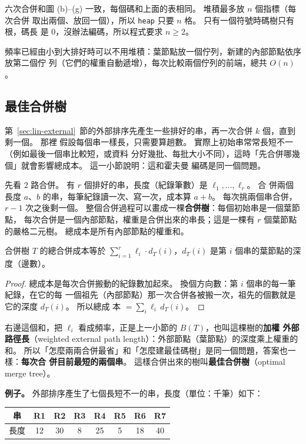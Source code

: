 六次合併和圖 (b)--(g) 一致，每個碼和上面的表相同。 堆積最多放 $n$ 個指標（每次合併
取出兩個、放回一個），所以 \texttt{heap} 只要 $n$ 格。 只有一個符號時碼樹只有根，碼長
是 $0$，沒辦法編碼，所以程式要求 $n \ge 2$。

頻率已經由小到大排好時可以不用堆積：葉節點放一個佇列，新建的內部節點依序放第二個佇
列（它們的權重自動遞增），每次比較兩個佇列的前端，總共 $O(n)$。

\subsection{最佳合併樹}
\label{sec:gr-merge}

第~\ref{sec:lin-external}~節的外部排序先產生一些排好的串，再一次合併 $k$ 個，直到剩一個。 那裡
假設每個串一樣長，只需要算趟數。 實際上初始串常常長短不一（例如最後一個串比較短，或資料
分好幾批、每批大小不同），這時「先合併哪幾個」就會影響總成本。 這一小節說明：這和霍夫曼
編碼是同一個問題。

先看 $2$ 路合併。 有 $r$ 個排好的串，長度（紀錄筆數）是 $\ell_1, \ldots, \ell_r$。 合
併兩個長度 $a$、$b$ 的串，每筆紀錄讀一次、寫一次，成本算 $a + b$。 每次挑兩個串合併，
$r - 1$ 次之後剩一個。 整個合併過程可以畫成一棵\textbf{合併樹}：每個初始串是一個葉節點，
每次合併是一個內部節點，權重是合併出來的串長；這是一棵有 $r$ 個葉節點的嚴格二元樹。
總成本是所有內部節點的權重和。

\begin{lemma}
\label{lem:gr-merge-cost}
合併樹 $T$ 的總合併成本等於 $\sum_{i=1}^{r} \ell_i \cdot d_T(i)$，$d_T(i)$ 是第 $i$
個串的葉節點的深度（邊數）。
\end{lemma}

\begin{proof}
總成本是每次合併搬動的紀錄數加起來。 換個方向數：第 $i$ 個串的每一筆紀錄，在它的每
一個祖先（內部節點）那一次合併各被搬一次，祖先的個數就是它的深度 $d_T(i)$。 所以總成
本 $= \sum_i \ell_i \, d_T(i)$。
\end{proof}

右邊這個和，把 $\ell_i$ 看成頻率，正是上一小節的 $B(T)$，也叫這棵樹的\textbf{加權
外部路徑長}（weighted external path length）：外部節點（葉節點）的深度乘上權重的和。
所以「怎麼兩兩合併最省」和「怎麼建最佳碼樹」是同一個問題，答案也一樣：\textbf{每次合
併目前最短的兩個串}。 這樣合併出來的樹叫\textbf{最佳合併樹}（optimal merge tree）。

\textbf{例子。} 外部排序產生了七個長短不一的串，長度（單位：千筆）如下：

\begin{center}
\begin{tabular}{c*{7}{c}}
\toprule
串 & R1 & R2 & R3 & R4 & R5 & R6 & R7 \\
\midrule
長度 & 12 & 30 & 8 & 25 & 5 & 18 & 40 \\
\bottomrule
\end{tabular}
\end{center}

